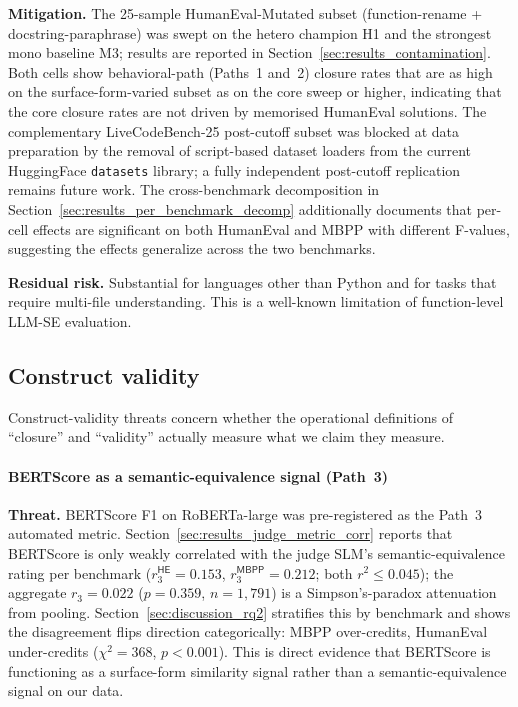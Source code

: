 \textbf{Mitigation.} The 25-sample HumanEval-Mutated subset (function-rename + docstring-paraphrase) was swept on the hetero champion H1 and the strongest mono baseline M3; results are reported in Section~\ref{sec:results_contamination}. Both cells show behavioral-path (Paths~1 and~2) closure rates that are as high on the surface-form-varied subset as on the core sweep or higher, indicating that the core closure rates are not driven by memorised HumanEval solutions. The complementary LiveCodeBench-25 post-cutoff subset was blocked at data preparation by the removal of script-based dataset loaders from the current HuggingFace \texttt{datasets} library; a fully independent post-cutoff replication remains future work. The cross-benchmark decomposition in Section~\ref{sec:results_per_benchmark_decomp} additionally documents that per-cell effects are significant on both HumanEval and MBPP with different F-values, suggesting the effects generalize across the two benchmarks.

\textbf{Residual risk.} Substantial for languages other than Python and for tasks that require multi-file understanding. This is a well-known limitation of function-level LLM-SE evaluation.

\subsection{Construct validity}

Construct-validity threats concern whether the operational definitions of ``closure'' and ``validity'' actually measure what we claim they measure.

\paragraph{BERTScore as a semantic-equivalence signal (Path~3)}

\textbf{Threat.} BERTScore F1 on RoBERTa-large was pre-registered as the Path~3 automated metric. Section~\ref{sec:results_judge_metric_corr} reports that BERTScore is only weakly correlated with the judge SLM's semantic-equivalence rating per benchmark ($r_3^{\textsf{HE}} = 0.153$, $r_3^{\textsf{MBPP}} = 0.212$; both $r^2 \leq 0.045$); the aggregate $r_3 = 0.022$ ($p = 0.359$, $n = 1{,}791$) is a Simpson's-paradox attenuation from pooling. Section~\ref{sec:discussion_rq2} stratifies this by benchmark and shows the disagreement flips direction categorically: MBPP over-credits, HumanEval under-credits ($\chi^2 = 368$, $p < 0.001$). This is direct evidence that BERTScore is functioning as a surface-form similarity signal rather than a semantic-equivalence signal on our data.

